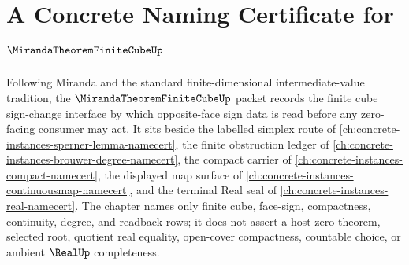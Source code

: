 \chapter{A Concrete Naming Certificate for $\MirandaTheoremFiniteCubeUp$}
\label{ch:concrete-instances-miranda-theorem-finite-cube-namecert}

Following Miranda and the standard finite-dimensional intermediate-value tradition, the $\MirandaTheoremFiniteCubeUp$ packet records the finite cube sign-change interface by which opposite-face sign data is read before any zero-facing consumer may act. It sits beside the labelled simplex route of \autoref{ch:concrete-instances-sperner-lemma-namecert}, the finite obstruction ledger of \autoref{ch:concrete-instances-brouwer-degree-namecert}, the compact carrier of \autoref{ch:concrete-instances-compact-namecert}, the displayed map surface of \autoref{ch:concrete-instances-continuousmap-namecert}, and the terminal Real seal of \autoref{ch:concrete-instances-real-namecert}. The chapter names only finite cube, face-sign, compactness, continuity, degree, and readback rows; it does not assert a host zero theorem, selected root, quotient real equality, open-cover compactness, countable choice, or ambient $\RealUp$ completeness.

